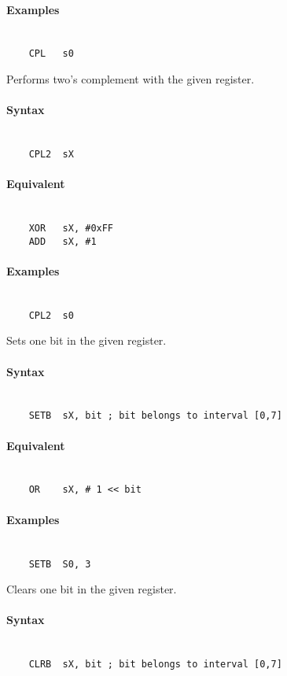     \paragraph{Examples}
        ~\\
        \verb'    CPL   s0'

    Performs two's complement with the given register.

    \paragraph{Syntax}
        ~\\
        \verb'    CPL2  sX'

    \paragraph{Equivalent}
        ~\\
        \verb'    XOR   sX, #0xFF'\\
        \verb'    ADD   sX, #1'

    \paragraph{Examples}
        ~\\
        \verb'    CPL2  s0'

    Sets one bit in the given register.

    \paragraph{Syntax}
        ~\\
        \verb'    SETB  sX, bit ; bit belongs to interval [0,7]'

    \paragraph{Equivalent}
        ~\\
        \verb'    OR    sX, # 1 << bit'

    \paragraph{Examples}
        ~\\
        \verb'    SETB  S0, 3'

    Clears one bit in the given register.

    \paragraph{Syntax}
        ~\\
        \verb'    CLRB  sX, bit ; bit belongs to interval [0,7]'

